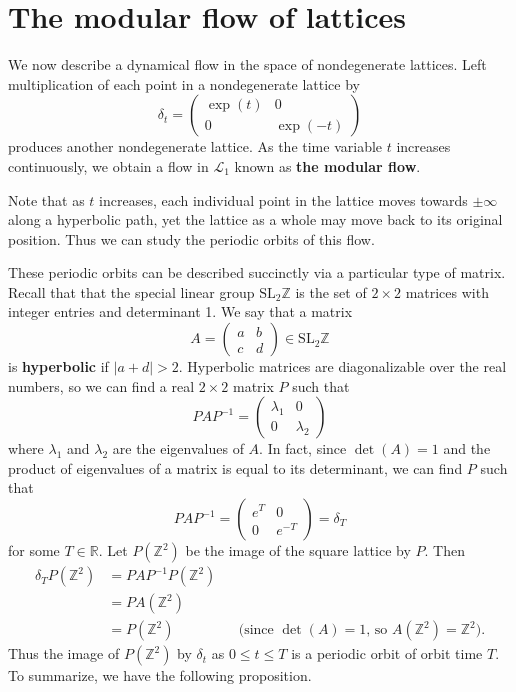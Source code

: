 \documentclass[12pt,twoside]{reedthesis}
\theoremstyle{definition}
\newcommand{\Z}{\mathbb{Z}}
\newcommand{\R}{\mathbb{R}}
\newcommand{\LS}{\mathcal{L}}
\newcommand{\SLZ}{\mathrm{SL}_2{\Z}}
\newcommand{\defnphrase}[1]{\textbf{#1}}
\begin{document}
\section{The modular flow of lattices}\label{subsec:lattice_flow}

We now describe a dynamical flow in the space of nondegenerate lattices.
Left multiplication of each point in a nondegenerate lattice by
\begin{equation}\label{eq:delta_t}
  \delta_t = \begin{pmatrix}
    \exp(t) & 0 \\
    0 & \exp(-t)
  \end{pmatrix}
\end{equation}
produces another nondegenerate lattice.
As the time variable $t$ increases continuously, we obtain a flow in $\LS_1$ known as \defnphrase{the modular flow}.
  
Note that as $t$ increases, each individual point in the lattice moves towards $\pm \infty$ along a hyperbolic path, yet the lattice as a whole may move back to its original position.
Thus we can study the periodic orbits of this flow. 

These periodic orbits can be described succinctly via a particular type of matrix.
Recall that that the special linear group $\SLZ$ is the set of $2 \times 2$ matrices with integer entries and determinant 1.
We say that a matrix
\begin{equation*}
  A = \begin{pmatrix}
    a & b \\
    c & d
  \end{pmatrix} \in \SLZ
\end{equation*}
is \defnphrase{hyperbolic} if $|a + d| > 2$.
Hyperbolic matrices are diagonalizable over the real numbers, so we can find a real $2 \times 2$ matrix $P$ such that
\begin{equation*}
  PAP^{-1} = \begin{pmatrix}
    \lambda_1 & 0 \\
    0 & \lambda_2
  \end{pmatrix}
\end{equation*}
where $\lambda_1$ and $\lambda_2$ are the eigenvalues of $A$.
In fact, since $\det(A) = 1$ and the product of eigenvalues of a matrix is equal to its determinant, we can find $P$ such that
\begin{equation*}
  PAP^{-1} = \begin{pmatrix}
    e^T & 0 \\
    0 & e^{-T}
  \end{pmatrix} = \delta_T
\end{equation*}
for some $T \in \R$.
Let $P(\Z^2)$ be the image of the square lattice by $P$.
Then
\begin{align*}
  \delta_{T}P(\Z^2) &= PAP^{-1} P(\Z^2) \\
  &= PA(\Z^2) \\
  &= P(\Z^2) && \text{(since $\det(A) = 1$, so $A(\Z^2) = \Z^2$).}
\end{align*}
Thus the image of $P(\Z^2)$ by $\delta_t$ as $0 \leq t \leq T$ is a periodic orbit of orbit time $T$.
To summarize, we have the following proposition.
\end{document}
